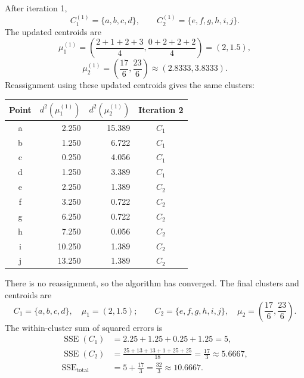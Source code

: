 \documentclass[11pt,a4paper]{article}
\begin{document}
After iteration 1,
\[
C_1^{(1)}=\{a,b,c,d\},\qquad C_2^{(1)}=\{e,f,g,h,i,j\}.
\]
The updated centroids are
\[
\mu_1^{(1)}=\left(\frac{2+1+2+3}{4},\frac{0+2+2+2}{4}\right)
=(2,1.5),
\]
\[
\mu_2^{(1)}=\left(\frac{17}{6},\frac{23}{6}\right)
\approx(2.8333,3.8333).
\]
Reassignment using these updated centroids gives the same clusters:

\begin{center}
\small
\begin{tabular}{c|r r|c}
\toprule
Point & \(d^2(\mu_1^{(1)})\) & \(d^2(\mu_2^{(1)})\) & Iteration 2\\
\midrule
a & 2.250 & 15.389 & \(C_1\)\\
b & 1.250 & 6.722 & \(C_1\)\\
c & 0.250 & 4.056 & \(C_1\)\\
d & 1.250 & 3.389 & \(C_1\)\\
e & 2.250 & 1.389 & \(C_2\)\\
f & 3.250 & 0.722 & \(C_2\)\\
g & 6.250 & 0.722 & \(C_2\)\\
h & 7.250 & 0.056 & \(C_2\)\\
i & 10.250 & 1.389 & \(C_2\)\\
j & 13.250 & 1.389 & \(C_2\)\\
\bottomrule
\end{tabular}
\end{center}
There is no reassignment, so the algorithm has converged. The final clusters and centroids are
\[
C_1=\{a,b,c,d\},\quad \mu_1=(2,1.5);
\qquad
C_2=\{e,f,g,h,i,j\},\quad \mu_2=\left(\frac{17}{6},\frac{23}{6}\right).
\]
The within-cluster sum of squared errors is
\[
\begin{aligned}
\operatorname{SSE}(C_1)
&=2.25+1.25+0.25+1.25=5,\\
\operatorname{SSE}(C_2)
&=\frac{25+13+13+1+25+25}{18}
=\frac{17}{3}\approx5.6667,\\
\operatorname{SSE}_{\mathrm{total}}
&=5+\frac{17}{3}=\boxed{\frac{32}{3}\approx10.6667}.
\end{aligned}
\]
\end{document}

